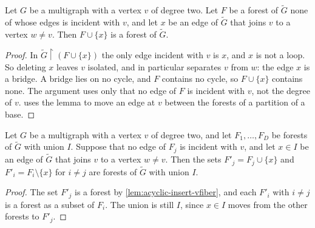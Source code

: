 \begin{lemma}
  \label{lem:acyclic-insert-vfiber}
  \leanok
  Let $G$ be a multigraph with a vertex $v$ of degree two. Let $F$ be a
  forest of $\tilde G$ none of whose edges is incident with $v$, and let
  $x$ be an edge of $\tilde G$ that joins $v$ to a vertex $w \neq v$.
  Then $F \cup \{x\}$ is a forest of $\tilde G$.
\end{lemma}
\begin{proof}
  \leanok
  In $\tilde G \restriction (F \cup \{x\})$ the only edge incident with
  $v$ is $x$, and $x$ is not a loop. So deleting $x$ leaves $v$
  isolated, and in particular separates $v$ from $w$: the edge $x$ is a
  bridge. A bridge lies on no cycle, and $F$ contains no cycle, so
  $F \cup \{x\}$ contains none. The argument uses only that no edge of
  $F$ is incident with $v$, not the degree of $v$.
   uses the lemma to move an edge at $v$ between
  the forests of a partition of a base.
\end{proof}

\begin{lemma}
  \label{lem:packing-move}
  \leanok
  Let $G$ be a multigraph with a vertex $v$ of degree two, and let
  $F_1, \dots, F_D$ be forests of $\tilde G$ with union $I$. Suppose
  that no edge of $F_j$ is incident with $v$, and let $x \in I$ be an
  edge of $\tilde G$ that joins $v$ to a vertex $w \neq v$. Then the
  sets $F'_j = F_j \cup \{x\}$ and $F'_i = F_i \setminus \{x\}$ for
  $i \neq j$ are forests of $\tilde G$ with union $I$.
\end{lemma}
\begin{proof}
  \leanok
  The set $F'_j$ is a forest by \cref{lem:acyclic-insert-vfiber}, and
  each $F'_i$ with $i \neq j$ is a forest as a subset of $F_i$. The
  union is still $I$, since $x \in I$ moves from the other forests to
  $F'_j$.
\end{proof}

